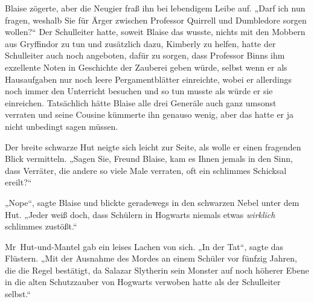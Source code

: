 Blaise zögerte, aber die Neugier fraß ihn bei lebendigem Leibe auf.
„Darf ich nun fragen, weshalb Sie für Ärger zwischen Professor Quirrell und Dumbledore sorgen wollen?“ Der Schulleiter hatte, soweit Blaise das wusste, nichts mit den Mobbern aus Gryffindor zu tun und zusätzlich dazu, Kimberly zu helfen, hatte der Schulleiter auch noch angeboten, dafür zu sorgen, dass Professor Binns ihm exzellente Noten in Geschichte der Zauberei geben würde, selbst wenn er als Hausaufgaben nur noch leere Pergamentblätter einreichte, wobei er allerdings noch immer den Unterricht besuchen und so tun musste als würde er sie einreichen. Tatsächlich hätte Blaise alle drei Generäle auch ganz umsonst verraten und seine Cousine kümmerte ihn genauso wenig, aber das hatte er ja nicht unbedingt sagen müssen.

Der breite schwarze Hut neigte sich leicht zur Seite, als wolle er einen fragenden Blick vermitteln.
„Sagen Sie, Freund Blaise, kam es Ihnen jemals in den Sinn, dass Verräter, die andere so viele Male verraten, oft ein schlimmes Schicksal ereilt?“

„Nope“, sagte Blaise und blickte geradewegs in den schwarzen Nebel unter dem Hut.
„Jeder weiß doch, dass Schülern in Hogwarts niemals etwas \emph{wirklich} schlimmes zustößt.“

Mr~Hut-und-Mantel gab ein leises Lachen von sich.
„In der Tat“, sagte das Flüstern.
„Mit der Ausnahme des Mordes an einem Schüler vor fünfzig Jahren, die die Regel bestätigt, da Salazar Slytherin sein Monster auf noch höherer Ebene in die alten Schutzzauber von Hogwarts verwoben hatte als der Schulleiter selbst.“

